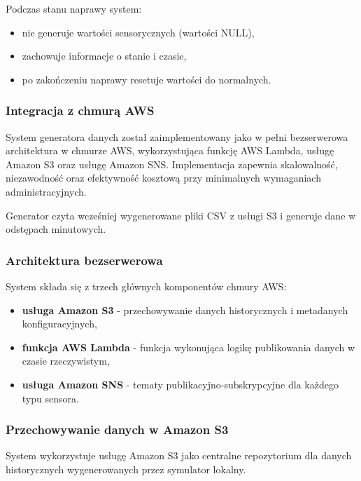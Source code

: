 Podczas stanu naprawy system:
\begin{itemize}
    \item nie generuje wartości sensorycznych (wartości NULL),
    \item zachowuje informacje o stanie i czasie,
    \item po zakończeniu naprawy resetuje wartości do normalnych.
\end{itemize}

\subsubsection{Integracja z chmurą AWS}
\label{sec:integracja_aws}

System generatora danych został zaimplementowany jako w pełni bezserwerowa architektura w chmurze AWS, wykorzystująca funkcję AWS Lambda, usługę Amazon S3 oraz usługę Amazon SNS. Implementacja zapewnia skalowalność, niezawodność oraz efektywność kosztową przy minimalnych wymaganiach administracyjnych.

Generator czyta wcześniej wygenerowane pliki CSV z usługi S3 i generuje dane w odstępach minutowych.

\subsubsection{Architektura bezserwerowa}
\label{subsec:architektura_bezserwerowa}

System składa się z trzech głównych komponentów chmury AWS:

\begin{itemize}
    \item \textbf{usługa Amazon S3} - przechowywanie danych historycznych i metadanych konfiguracyjnych,
    \item \textbf{funkcja AWS Lambda} - funkcja wykonująca logikę publikowania danych w czasie rzeczywistym,
    \item \textbf{usługa Amazon SNS} - tematy publikacyjno-subskrypcyjne dla każdego typu sensora.
\end{itemize}

\subsubsection{Przechowywanie danych w Amazon S3}
\label{subsec:amazon_s3}

System wykorzystuje usługę Amazon S3 jako centralne repozytorium dla danych historycznych wygenerowanych przez symulator lokalny.

